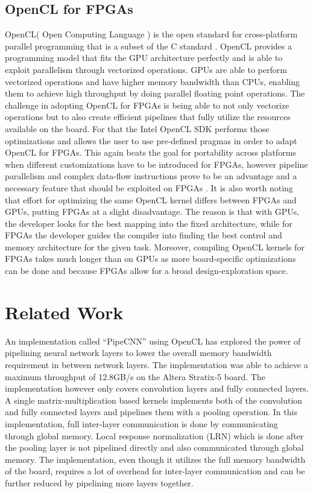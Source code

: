 \subsection{OpenCL for FPGAs}
OpenCL\texttrademark ( Open Computing Language ) is the open standard for cross-platform parallel programming that is a subset of the C standard \cite{opencl}. OpenCL provides a programming model that fits the GPU architecture perfectly and is able to exploit parallelism through vectorized operations. GPUs are able to perform vectorized operations and have higher memory bandwidth than CPUs, enabling them to achieve high throughput by doing parallel floating point operations. The challenge in adopting OpenCL for FPGAs is being able to not only vectorize operations but to also create efficient pipelines that fully utilize the resources available on the board. For that the Intel OpenCL SDK \cite{intel2016sdk, deepfpga} performs those optimizations and allows the user to use pre-defined pragmas in order to adapt OpenCL for FPGAs. This again beats the goal for portability across platforms when different customizations have to be introduced for FPGAs, however pipeline parallelism and complex data-flow instructions prove to be an advantage and a necessary feature that should be exploited on FPGAs \cite{ddl, deepfpga}.  It is also worth noting that effort for optimizing the same OpenCL kernel differs between FPGAs and GPUs, putting FPGAs at a slight disadvantage. The reason is that with GPUs, the developer looks for the best mapping into the fixed architecture, while for FPGAs the developer guides the compiler into finding the best control and memory architecture for the given task. Moreover, compiling OpenCL kernels for FPGAs takes much longer than on GPUs as more board-specific optimizations can be done and because FPGAs allow for a broad design-exploration space.


\section{Related Work}

An implementation called “PipeCNN” \cite{pipecnn} using OpenCL has explored the power of pipelining neural network layers to lower the overall memory bandwidth requirement in between network layers. The implementation was able to achieve a maximum throughput of 12.8GB/s on the Altera Stratix-5 board. The implementation however only covers convolution layers and fully connected layers. A single matrix-multiplication based kernels implements both of the convolution and fully connected layers and pipelines them with a pooling operation. In this implementation, full inter-layer communication is done by communicating through global memory. Local response normalization (LRN) which is done after the pooling layer is not pipelined directly and also communicated through global memory. The implementation, even though it utilizes the full memory bandwidth of the board, requires a lot of overhead for inter-layer communication and can be further reduced by pipelining more layers together.

